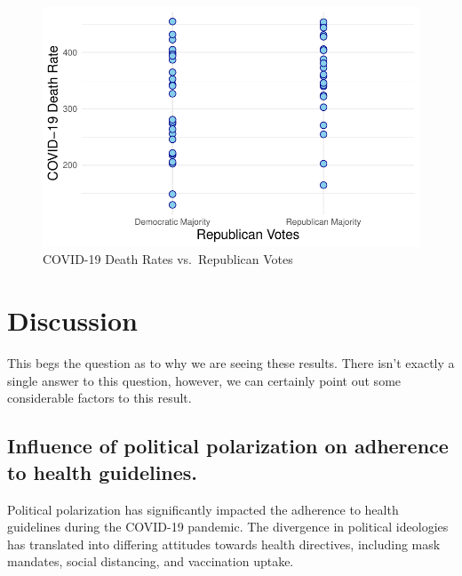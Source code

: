\documentclass[
  letterpaper,
  DIV=11,
  numbers=noendperiod]{scrartcl}
\begin{document}
\begin{figure}

{\centering \includegraphics{paper_files/figure-pdf/fig-deaths-rates-votes-1.pdf}

}

\caption{\label{fig-deaths-rates-votes}COVID-19 Death Rates
vs.~Republican Votes}

\end{figure}

\hypertarget{discussion}{%
\section{Discussion}\label{discussion}}

This begs the question as to why we are seeing these results. There
isn't exactly a single answer to this question, however, we can
certainly point out some considerable factors to this result.

\hypertarget{influence-of-political-polarization-on-adherence-to-health-guidelines.}{%
\subsection{Influence of political polarization on adherence to health
guidelines.}\label{influence-of-political-polarization-on-adherence-to-health-guidelines.}}

Political polarization has significantly impacted the adherence to
health guidelines during the COVID-19 pandemic. The divergence in
political ideologies has translated into differing attitudes towards
health directives, including mask mandates, social distancing, and
vaccination uptake.
\end{document}
